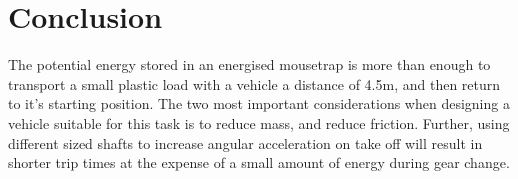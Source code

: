 \documentclass[a4paper]{article}
\begin{document}
\section{Conclusion}
The potential energy stored in an energised mousetrap is more than enough to transport a small plastic load with a vehicle a distance of 4.5$\si{\meter}$, and then return to it's starting position. The two most important considerations when designing a vehicle suitable for this task is to reduce mass, and reduce friction. Further, using different sized shafts to increase angular acceleration on take off will result in shorter trip times at the expense of a small amount of energy during gear change.



\end{document}
